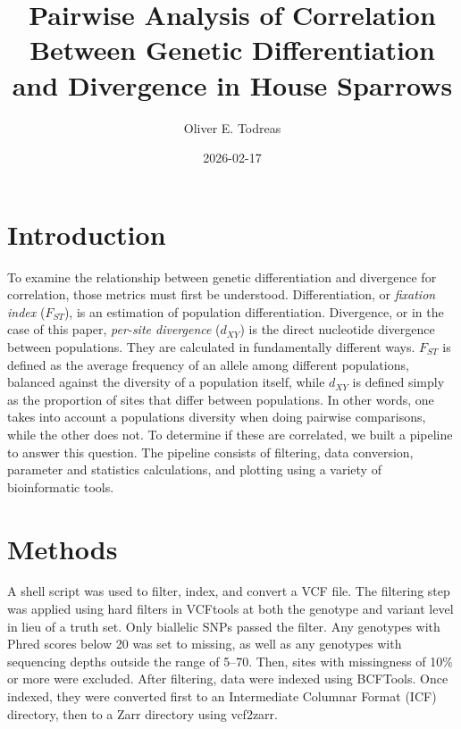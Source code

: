 \documentclass{article}
\begin{document}
\title{Pairwise Analysis of Correlation Between Genetic Differentiation and Divergence in House Sparrows}
\date{2026-02-17}
\author{Oliver E. Todreas}

\maketitle

\section{Introduction}

To examine the relationship between genetic differentiation and divergence for correlation, those metrics must first be understood. Differentiation, or \textit{fixation index} ($F_{ST}$), is an estimation of population differentiation. Divergence, or in the case of this paper, \textit{per-site divergence} ($d_{XY}$) is the direct nucleotide divergence between populations. They are calculated in fundamentally different ways. $F_{ST}$ is defined as the average frequency of an allele among different populations, balanced against the diversity of a population itself, while $d_{XY}$ is defined simply as the proportion of sites that differ between populations. In other words, one takes into account a populations diversity when doing pairwise comparisons, while the other does not. To determine if these are correlated, we built a pipeline to answer this question. The pipeline consists of filtering, data conversion, parameter and statistics calculations, and plotting using a variety of bioinformatic tools.

\section{Methods}

A shell script was used to filter, index, and convert a VCF file. The filtering step was applied using hard filters in VCFtools at both the genotype and variant level in lieu of a truth set. Only biallelic SNPs passed the filter. Any genotypes with Phred scores below 20 was set to missing, as well as any genotypes with sequencing depths outside the range of 5–70. Then, sites with missingness of 10\% or more were excluded. After filtering, data were indexed using BCFTools. Once indexed, they were converted first to an Intermediate Columnar Format (ICF) directory, then to a Zarr directory using vcf2zarr.
\end{document}

